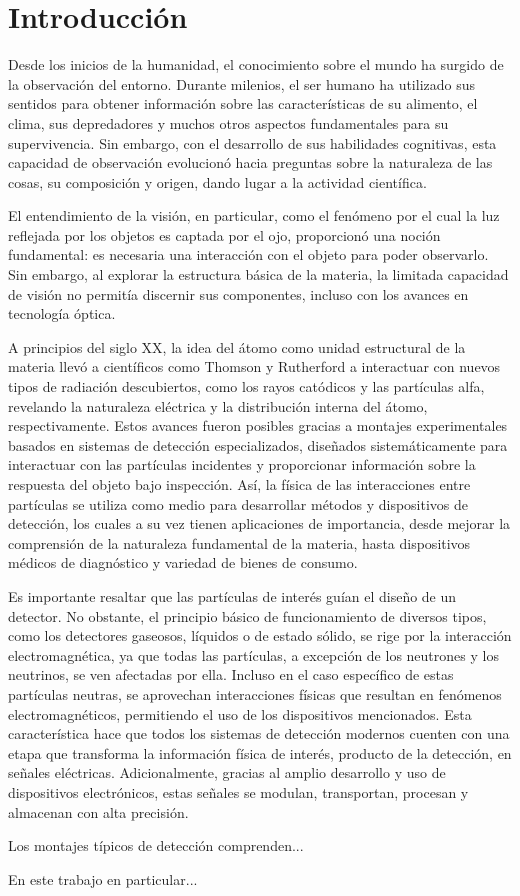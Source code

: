 \documentclass[]{book}
\begin{document}
\chapter{Introducción}

Desde los inicios de la humanidad, el conocimiento sobre el mundo ha surgido de la observación del entorno. Durante milenios, el ser humano ha utilizado sus sentidos para obtener información sobre las características de su alimento, el clima, sus depredadores y muchos otros aspectos fundamentales para su supervivencia. Sin embargo, con el desarrollo de sus habilidades cognitivas, esta capacidad de observación evolucionó hacia preguntas sobre la naturaleza de las cosas, su composición y origen, dando lugar a la actividad científica.

\noindent El entendimiento de la visión, en particular, como el fenómeno por el cual la luz reflejada por los objetos es captada por el ojo, proporcionó una noción fundamental: es necesaria una interacción con el objeto para poder observarlo. Sin embargo, al explorar la estructura básica de la materia, la limitada capacidad de visión no permitía discernir sus componentes, incluso con los avances en tecnología óptica.

\noindent A principios del siglo XX, la idea del átomo como unidad estructural de la materia llevó a científicos como Thomson y Rutherford a interactuar con nuevos tipos de radiación descubiertos, como los rayos catódicos y las partículas alfa, revelando la naturaleza eléctrica y la distribución interna del átomo, respectivamente. Estos avances fueron posibles gracias a montajes experimentales basados en sistemas de detección especializados, diseñados sistemáticamente para interactuar con las partículas incidentes y proporcionar información sobre la respuesta del objeto bajo inspección. Así, la física de las interacciones entre partículas se utiliza como medio para desarrollar métodos y dispositivos de detección, los cuales a su vez tienen aplicaciones de importancia, desde mejorar la comprensión de la naturaleza fundamental de la materia, hasta dispositivos médicos de diagnóstico y variedad de bienes de consumo.

\noindent Es importante resaltar que las partículas de interés guían el diseño de un detector. No obstante, el principio básico de funcionamiento de diversos tipos, como los detectores gaseosos, líquidos o de estado sólido, se rige por la interacción electromagnética, ya que todas las partículas, a excepción de los neutrones y los neutrinos, se ven afectadas por ella. Incluso en el caso específico de estas partículas neutras, se aprovechan interacciones físicas que resultan en fenómenos electromagnéticos, permitiendo el uso de los dispositivos mencionados. Esta característica hace que todos los sistemas de detección modernos cuenten con una etapa que transforma la información física de interés, producto de la detección, en señales eléctricas. Adicionalmente, gracias al amplio desarrollo y uso de dispositivos electrónicos, estas señales se modulan, transportan, procesan y almacenan con alta precisión.

\noindent Los montajes típicos de detección comprenden...

\noindent En este trabajo en particular...
\end{document}
